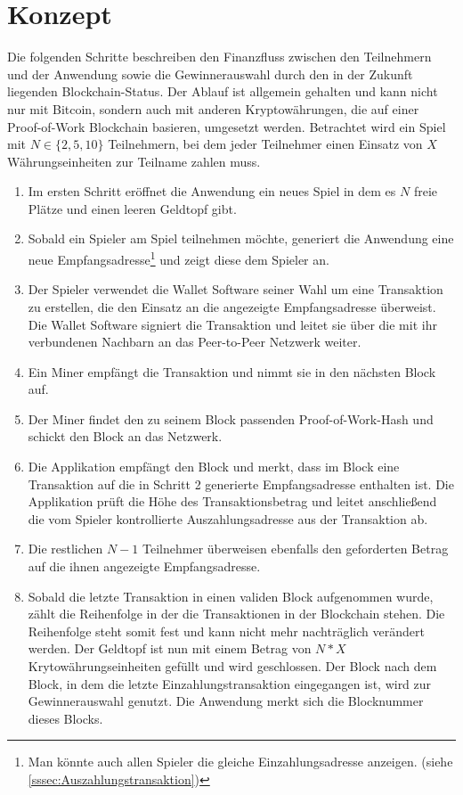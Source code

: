\section{Konzept}

Die folgenden Schritte beschreiben den Finanzfluss zwischen den Teilnehmern und der Anwendung sowie die Gewinnerauswahl durch den in der Zukunft liegenden Blockchain-Status. Der Ablauf ist allgemein gehalten und kann nicht nur mit Bitcoin, sondern auch mit anderen Kryptowährungen, die auf einer Proof-of-Work Blockchain basieren, umgesetzt werden. Betrachtet wird ein Spiel mit $N \in \{2,5,10\}$ Teilnehmern, bei dem jeder Teilnehmer einen Einsatz von $X$ Währungseinheiten zur Teilname zahlen muss. 

\begin{enumerate}
\item Im ersten Schritt eröffnet die Anwendung ein neues Spiel in dem es $N$ freie Plätze und einen leeren Geldtopf gibt.
\item Sobald ein Spieler am Spiel teilnehmen möchte, generiert die Anwendung eine neue Empfangsadresse\footnote{Man könnte auch allen Spieler die gleiche Einzahlungsadresse anzeigen. (siehe \ref{sssec:Auszahlungstransaktion})} und zeigt diese dem Spieler an.
\item Der Spieler verwendet die Wallet Software seiner Wahl um eine Transaktion zu erstellen, die den Einsatz an die angezeigte Empfangsadresse überweist. Die Wallet Software signiert die Transaktion und leitet sie über die mit ihr verbundenen Nachbarn an das Peer-to-Peer Netzwerk weiter.
\item Ein Miner empfängt die Transaktion und nimmt sie in den nächsten Block auf.
\item Der Miner findet den zu seinem Block passenden Proof-of-Work-Hash und schickt den Block an das Netzwerk.
\item Die Applikation empfängt den Block und merkt, dass im Block eine Transaktion auf die in Schritt 2 generierte Empfangsadresse enthalten ist. Die Applikation prüft die Höhe des Transaktionsbetrag und leitet anschließend die vom Spieler kontrollierte Auszahlungsadresse aus der Transaktion ab. 
\item  Die restlichen $N-1$ Teilnehmer überweisen ebenfalls den geforderten Betrag auf die ihnen angezeigte Empfangsadresse.
\item  Sobald die letzte Transaktion in einen validen Block aufgenommen wurde, zählt die Reihenfolge in der die Transaktionen in der Blockchain stehen. Die Reihenfolge steht somit fest und kann nicht mehr nachträglich verändert werden. Der Geldtopf ist nun mit einem Betrag von $N*X$ Krytowährungseinheiten gefüllt und wird geschlossen. Der Block nach dem Block, in dem die letzte Einzahlungstransaktion eingegangen ist, wird zur Gewinnerauswahl genutzt. Die Anwendung merkt sich die Blocknummer dieses Blocks.

\end{enumerate}
